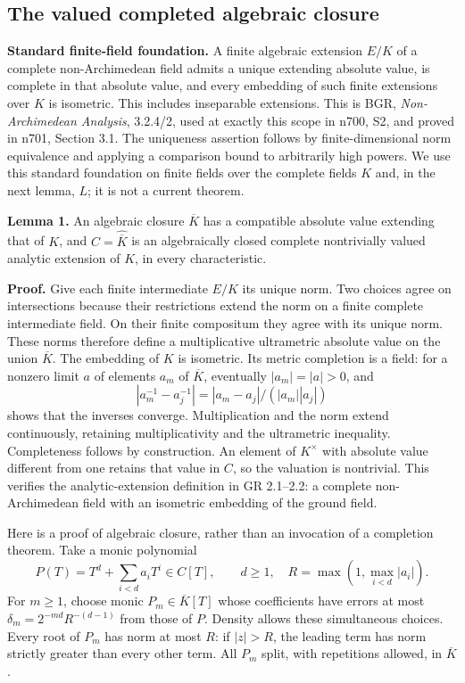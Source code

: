 \documentclass[
  11pt,
]{article}
\begin{document}
\subsection{The valued completed algebraic
closure}\label{the-valued-completed-algebraic-closure}

\textbf{Standard finite-field foundation.} A finite algebraic extension
\(E/K\) of a complete non-Archimedean field admits a unique extending
absolute value, is complete in that absolute value, and every embedding
of such finite extensions over \(K\) is isometric. This includes
inseparable extensions. This is BGR, \emph{Non-Archimedean Analysis},
3.2.4/2, used at exactly this scope in n700, S2, and proved in n701,
Section 3.1. The uniqueness assertion follows by finite-dimensional norm
equivalence and applying a comparison bound to arbitrarily high powers.
We use this standard foundation on finite fields over the complete
fields \(K\) and, in the next lemma, \(L\); it is not a current theorem.

\textbf{Lemma 1.} An algebraic closure \(\overline K\) has a compatible
absolute value extending that of \(K\), and \(C=\widehat{\overline K}\)
is an algebraically closed complete nontrivially valued analytic
extension of \(K\), in every characteristic.

\textbf{Proof.} Give each finite intermediate \(E/K\) its unique norm.
Two choices agree on intersections because their restrictions extend the
norm on a finite complete intermediate field. On their finite compositum
they agree with its unique norm. These norms therefore define a
multiplicative ultrametric absolute value on the union \(\overline K\).
The embedding of \(K\) is isometric. Its metric completion is a field:
for a nonzero limit \(a\) of elements \(a_m\) of \(\overline K\),
eventually \(|a_m|=|a|>0\), and \[
 |a_m^{-1}-a_j^{-1}|=|a_m-a_j|/(|a_m||a_j|)
\] shows that the inverses converge. Multiplication and the norm extend
continuously, retaining multiplicativity and the ultrametric inequality.
Completeness follows by construction. An element of \(K^\times\) with
absolute value different from one retains that value in \(C\), so the
valuation is nontrivial. This verifies the analytic-extension definition
in GR 2.1--2.2: a complete non-Archimedean field with an isometric
embedding of the ground field.

Here is a proof of algebraic closure, rather than an invocation of a
completion theorem. Take a monic polynomial \[
 P(T)=T^d+\sum_{i<d}a_iT^i\in C[T],\qquad d\geq1,
 \quad R=\max(1,\max_{i<d}|a_i|).
\] For \(m\geq1\), choose monic \(P_m\in\overline K[T]\) whose
coefficients have errors at most \(\delta_m=2^{-md}R^{-(d-1)}\) from
those of \(P\). Density allows these simultaneous choices. Every root of
\(P_m\) has norm at most \(R\): if \(|z|>R\), the leading term has norm
strictly greater than every other term. All \(P_m\) split, with
repetitions allowed, in \(\overline K\).
\end{document}
